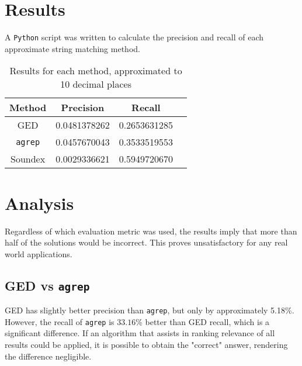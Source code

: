 \documentclass[11pt]{article}
\begin{document}
\section{Results}

A \texttt{Python} script was written to calculate the precision and recall of each approximate string matching method.

\begin{table}[h]
 \begin{center}
\begin{tabular}{|c||c|c|c|}

\hline
Method & Precision & Recall \\
\hline\hline
GED & 0.0481378262 & 0.2653631285 \\ 
\texttt{agrep} & 0.0457670043 & 0.3533519553 \\ 
Soundex & 0.0029336621 & 0.5949720670 \\
\hline

\end{tabular}
\caption{Results for each method, approximated to 10 decimal places}\label{results}
 \end{center}
\end{table}

\section{Analysis}
Regardless of which evaluation metric was used, the results imply that more than half of the solutions would be incorrect. This proves unsatisfactory for any real world applications. 



\subsection{GED vs \texttt{agrep}}
GED has slightly better precision than \texttt{agrep}, but only by approximately 5.18\%. However, the recall of \texttt{agrep} is \(33.16\%\) better than GED recall, which is a significant difference. If an algorithm that assists in ranking relevance of all results could be applied, it is possible to obtain the "correct" answer, rendering the difference negligible.%
 
\end{document}
